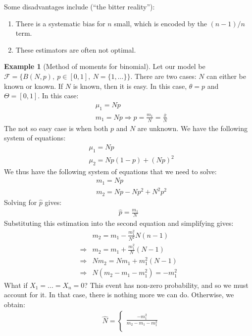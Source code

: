 \documentclass[11pt]{scrartcl}
\theoremstyle{definition}
\newtheorem{ex}{Example}
\theoremstyle{remark}
\newcommand{\dist}[0]{\mathcal{F}}
\begin{document}
Some disadvantages include (``the bitter reality''): 
	\begin{enumerate}[noitemsep]
		\item There is a systematic bias for $n$ small, which is encoded by the $(n-1)/n$ term. 
		\item These estimators are often not optimal. 
	\end{enumerate}
	

\begin{ex}[Method of moments for binomial] 
	Let our model be $\dist = \{ B(N,p),\ p \in [0,1],\ N=\{ 1,... \} \} $. There are two cases: $N$ can either be known or known. If $N$ is known, then it is easy. In this case, $\theta = p$ and $\Theta = [0,1]$. In this case: 
	\begin{align*}
		& \mu_1 = Np \\
		& m_1 = Np \Rightarrow \hat{p} = \frac{m_1}{N}	 = \frac{\overline{x}}{N}
	\end{align*}
	The not so easy case is when both $p$ and $N$ are unknown. We have the following system of equations: 
	\begin{align*}
		& \mu_1 = Np 	\\
		& \mu_2 = Np(1-p) + (Np)^2 
	\end{align*}
	We thus have the following system of equations that we need to solve: 
	\begin{align*}
		& m_1 = Np \\	
		& m_2 = Np - Np^2  + N^2p^2 
	\end{align*}
	Solving for $\hat{p}$ gives: 
	\begin{align*}
		\hat{p} = \frac{m_1}{N}	
	\end{align*}
	Substituting this estimation into the second equation and simplifying gives: 
	\begin{align*}
		& m_2 = m_1 - \frac{m_1^2}{N^2} N(n-1) \\
		 \Rightarrow &  m_2 	= m_1 + \frac{m_1^2}{N} (N-1) \\
		 \Rightarrow & Nm_2 = Nm_1 + m_1^2 (N-1) \\
		 \Rightarrow & N(m_2 - m_1 - m_1^2) = -m_1^2 
	\end{align*}
	What if $X_1 = ... = X_n = 0$? This event has non-zero probability, and so we must account for it. In that case, there is nothing more we can do. Otherwise, we obtain: 
	\begin{align*}
		& \hat{N} = \begin{cases}
				\frac{-m_1^2}{m_2 - m_1 - m_1^2} \\

\end{cases}
\end{align*}
\end{ex}
\end{document}
